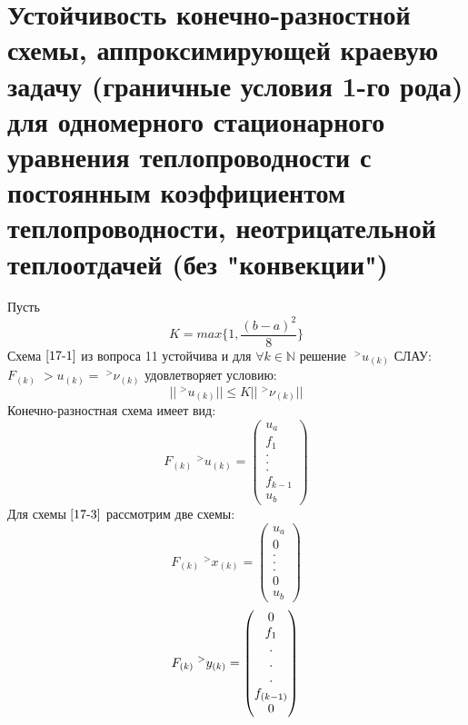 \documentclass[__main__.tex]{subfiles}
\begin{document}
\section{Устойчивость конечно-разностной схемы, аппроксимирующей краевую задачу (граничные условия 1-го рода) для одномерного стационарного уравнения теплопроводности с постоянным коэффициентом теплопроводности, неотрицательной теплоотдачей (без "конвекции")}

Пусть 
\begin{equation}
	K = max\{1,\frac{(b-a)^2}{8}\}
	\label{17-1}
\end{equation}
Схема $\ref{17-1}$ из вопроса 11 устойчива и для $\forall k \in \mathbb{N}$ решение $\;^>u_{(k)}$ СЛАУ: $F_{(k)}\;>u_{(k)} = \;^>\nu_{(k)}$ удовлетворяет условию:
\begin{equation}
	||\;^>u_{(k)}|| \le K ||\;^>\nu_{(k)}||
	\label{17-2}
\end{equation}
Конечно-разностная схема имеет вид:
\begin{equation}
	F_{(k)}\;^>u_{(k)} =
	\begin{pmatrix}
		u_a\\
		f_1\\
		.\\
		.\\
		.\\
		f_{k-1}\\
		u_b
	\end{pmatrix}
	\label{17-3}
\end{equation}
Для схемы $\ref{17-3}$ рассмотрим две схемы:
\begin{equation}
	F_{(k)}\;^>x_{(k)} =
	\begin{pmatrix}
		u_a\\
		0\\
		.\\
		.\\
		.\\
		0\\
		u_b
	\end{pmatrix}
	\label{17-4}
\end{equation}
\begin{equation}
	F_{(k)}\;^>y_{(k)} =
	\begin{pmatrix}
		0\\
		f_1\\
		.\\
		.\\
		.\\
		f_{(k-1)}\\
		0
	\end{pmatrix}\\
	\label{17-5}
\end{equation}
\end{document}
